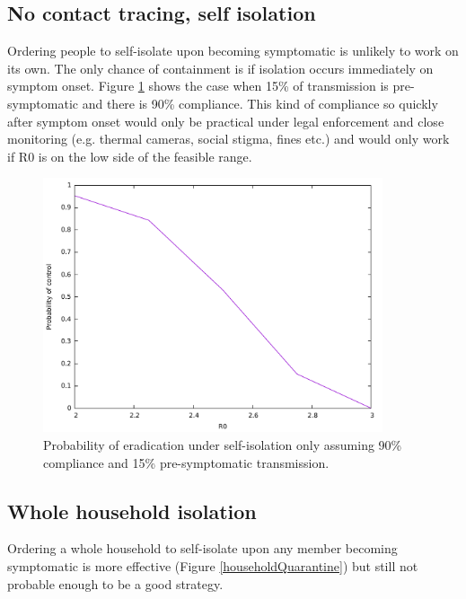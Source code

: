 \documentclass{article}
\begin{document}
\subsection{No contact tracing, self isolation}

Ordering people to self-isolate upon becoming symptomatic is unlikely to work on its own. The only chance of containment is if isolation occurs immediately on symptom onset. Figure \ref{noTracing} shows the case when 15\% of transmission is pre-symptomatic and there is 90\% compliance. This kind of compliance so quickly after symptom onset would only be practical under legal enforcement and close monitoring (e.g. thermal cameras, social stigma, fines etc.) and would only work if R0 is on the low side of the feasible range.

\begin{figure}
\begin{center}
\includegraphics[width = 10cm]{noTracingR0.pdf}
\end{center}
\caption{Probability of eradication under self-isolation only assuming 90\% compliance and 15\% pre-symptomatic transmission.}
\label{noTracing}
\end{figure}

\subsection{Whole household isolation}

Ordering a whole household to self-isolate upon any member becoming symptomatic is more effective (Figure \ref{householdQuarantine}) but still not probable enough to be a good strategy.
\end{document}
